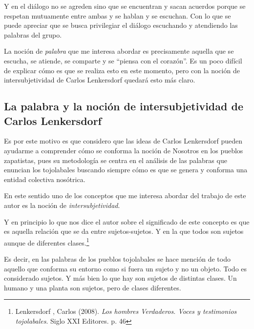 \documentclass[oneside]{book}
\begin{document}
Y en el diálogo no se agreden sino que se encuentran y sacan acuerdos porque se respetan mutuamente entre ambas y se hablan y se escuchan. Con lo que se puede apreciar que se busca privilegiar el diálogo escuchando y atendiendo las palabras del grupo.

La noción de \textit{palabra} que me interesa abordar es precisamente aquella que se escucha, se atiende, se comparte y se “piensa con el corazón”. Es un poco difícil de explicar cómo es que se realiza esto en este momento, pero con la noción de intersubjetividad de Carlos Lenkersdorf quedará esto más claro.

\subsection{La palabra y la noción de intersubjetividad de Carlos Lenkersdorf}

Es por este motivo es que considero que las ideas de Carlos Lenkersdorf pueden ayudarme a comprender cómo se conforma la noción de Nosotros en los pueblos zapatistas, pues su metodología se centra en el análisis de las palabras que enuncian los tojolabales buscando siempre cómo es que se genera y conforma una entidad colectiva nosótrica. 

En este sentido uno de los conceptos que me interesa abordar del trabajo de este autor es la noción de \textit{intersubjetividad}.

Y en principio lo que nos dice el autor sobre el significado de este concepto es que es aquella relación que se da entre sujetos-sujetos. Y en la que todos son sujetos aunque de diferentes clases.\footnote{Lenkersdorf , Carlos (2008). \textit{Los hombres Verdaderos. Voces y testimonios tojolabales}. Siglo XXI Editores. p. 46}

Es decir, en las palabras de los pueblos tojolabales se hace mención de todo aquello que conforma su entorno como si fuera un sujeto y no un  objeto. Todo es considerado sujetos. Y más bien lo que hay son sujetos de distintas clases. Un humano y una planta son sujetos, pero de clases diferentes.
\end{document}
